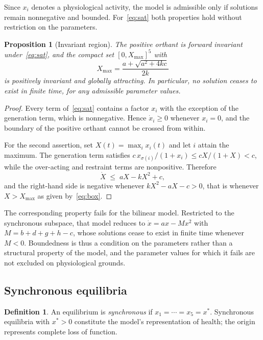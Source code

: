 \documentclass[11pt]{article}
\newtheorem{proposition}[theorem]{Proposition}
\theoremstyle{definition}
\newtheorem{definition}[theorem]{Definition}
\theoremstyle{remark}
\begin{document}
	Since $x_i$ denotes a physiological activity, the model is admissible only if
	solutions remain nonnegative and bounded. For~\eqref{eq:sat} both properties hold
	without restriction on the parameters.
	
	\begin{proposition}[Invariant region]\label{prop:box}
		The positive orthant is forward invariant under~\eqref{eq:sat}, and the compact set
		$[0,X_{\max}]^5$ with
		\begin{equation}\label{eq:box}
			X_{\max}=\frac{a+\sqrt{a^{2}+4kc}}{2k}
		\end{equation}
		is positively invariant and globally attracting. In particular, no solution ceases
		to exist in finite time, for any admissible parameter values.
	\end{proposition}
	
	\begin{proof}
		Every term of~\eqref{eq:sat} contains a factor $x_i$ with the exception of the
		generation term, which is nonnegative. Hence $\dot x_i\ge0$ whenever $x_i=0$, and
		the boundary of the positive orthant cannot be crossed from within.
		
		For the second assertion, set $X(t)=\max_i x_i(t)$ and let $i$ attain the maximum.
		The generation term satisfies $c\,x_{\sigma(i)}/(1+x_i)\le cX/(1+X)<c$, while the
		over-acting and restraint terms are nonpositive. Therefore
		\[
		\dot X\;\le\;aX-kX^{2}+c ,
		\]
		and the right-hand side is negative whenever $kX^{2}-aX-c>0$, that is whenever
		$X>X_{\max}$ as given by~\eqref{eq:box}.
	\end{proof}
	
	The corresponding property fails for the bilinear model. Restricted to the
	synchronous subspace, that model reduces to $\dot x=ax-Mx^{2}$ with
	$M=b+d+g+h-c$, whose solutions cease to exist in finite time whenever $M<0$.
	Boundedness is thus a condition on the parameters rather than a structural property
	of the model, and the parameter values for which it fails are not excluded on
	physiological grounds.
	
	\subsection{Synchronous equilibria}
	
	\begin{definition}
		An equilibrium is \emph{synchronous} if $x_1=\cdots=x_5=x^\ast$. Synchronous
		equilibria with $x^\ast>0$ constitute the model's representation of health; the
		origin represents complete loss of function.
	\end{definition}
	
\end{document}
